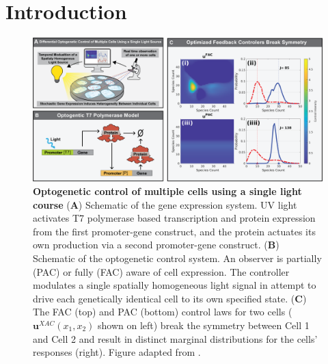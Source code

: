 \documentclass[12pt]{article}
\begin{document}
%
%
%
\maketitle
% 

\section{Introduction}
\begin{figure}
\begin{center}
\includegraphics[width=\columnwidth]{CartoonAndControler.png}
\caption{{\bf Optogenetic control of multiple cells using a single light course}
({\bf A}) Schematic of the gene expression system. UV light activates T7 polymerase based transcription and protein expression from the first promoter-gene construct, and the protein actuates its own production via a second promoter-gene construct.
({\bf B}) Schematic of the optogenetic control system. An observer is partially (PAC) or fully (FAC) aware of cell expression. The controller modulates a single spatially homogeneous light signal in attempt to drive each genetically identical cell to its own specified state.  
({\bf C}) The FAC (top) and PAC (bottom) control laws for two cells ($\mathbf{u}^{XAC}(x_1,x_2)$ shown on left) break the symmetry between Cell 1 and Cell 2 and result in distinct marginal distributions for the cells' responses (right).
Figure adapted from \cite{May2021}.}
\label{cartoons}
\end{center}
\vspace{-0.3in}
\end{figure}
\end{document}
